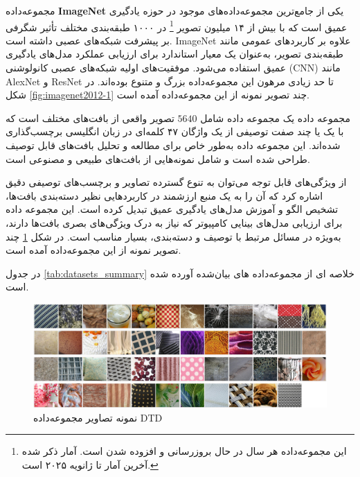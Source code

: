 مجموعه‌داده \textbf{ImageNet}
\cite{russakovskyImageNetLargeScale2015}
یکی از جامع‌ترین مجموعه‌داده‌های موجود در حوزه یادگیری عمیق است که با بیش از ۱۴ میلیون تصویر
\footnote{این مجموعه‌داده هر سال در حال بروزرسانی و افزوده شدن است. آمار ذکر شده آخرین آمار تا ژانویه ۲۰۲۵ است.}
در ۱۰۰۰ طبقه‌بندی مختلف تأثیر شگرفی بر پیشرفت شبکه‌های عصبی داشته است. ImageNet علاوه بر کاربردهای عمومی مانند طبقه‌بندی تصویر، به‌عنوان یک معیار استاندارد برای ارزیابی عملکرد مدل‌های یادگیری عمیق استفاده می‌شود. موفقیت‌های اولیه شبکه‌های عصبی کانولوشنی (CNN) مانند AlexNet و ResNet تا حد زیادی مرهون این مجموعه‌داده بزرگ و متنوع بوده‌اند. در شکل \ref{fig:imagenet2012-1} چند تصویر نمونه از این مجموعه‌داده آمده است.



مجموعه داده
\cite{cimpoiDescribingTexturesWild2013}
یک مجموعه داده شامل $5640$ تصویر واقعی از بافت‌های مختلف است که با یک یا چند صفت توصیفی از یک واژگان ۴۷ کلمه‌ای در زبان انگلیسی برچسب‌گذاری شده‌اند. این مجموعه داده به‌طور خاص برای مطالعه و تحلیل بافت‌های قابل توصیف طراحی شده است و شامل نمونه‌هایی از بافت‌های طبیعی و مصنوعی است. 

از ویژگی‌های قابل توجه  می‌توان به تنوع گسترده تصاویر و برچسب‌های توصیفی دقیق اشاره کرد که آن را به یک منبع ارزشمند در کاربردهایی نظیر دسته‌بندی بافت‌ها، تشخیص الگو و آموزش مدل‌های یادگیری عمیق تبدیل کرده است. این مجموعه داده برای ارزیابی مدل‌های بینایی کامپیوتر که نیاز به درک ویژگی‌های بصری بافت‌ها دارند، به‌ویژه در مسائل مرتبط با توصیف و دسته‌بندی، بسیار مناسب است. در شکل \ref{fig:dtd1} چند تصویر نمونه از این مجموعه‌داده آمده است.

در جدول \ref{tab:datasets_summary} خلاصه ای از مجموعه‌داده های بیان‌شده آورده شده است.

\begin{figure}
	\centering
	\includegraphics[width=0.7\linewidth]{dtd1}
	\caption{نمونه تصاویر مجموعه‌داده DTD}
	\label{fig:dtd1}
\end{figure}



